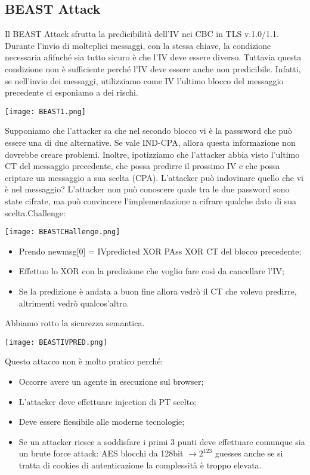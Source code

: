 \documentclass{article}
\theoremstyle{remark}
\begin{document}
\subsection{BEAST Attack}
Il BEAST Attack sfrutta la predicibilità dell'IV nei CBC in TLS v.1.0/1.1. Durante l'invio di molteplici messaggi, con la stessa chiave, la condizione necessaria afifnché sia tutto sicuro è che l'IV deve essere diverso. Tuttavia questa condizione non è sufficiente perché l'IV deve essere anche non predicibile.
Infatti, se nell'invio dei messaggi, utilizziamo come IV l'ultimo blocco del messaggio precedente ci esponiamo a dei rischi.
\begin{center}
    \texttt{[image: BEAST1.png]}
\end{center}
Supponiamo che l'attacker sa che nel secondo blocco vi è la passsword che può essere una di due alternative. Se vale IND-CPA, allora questa informazione non dovrebbe creare problemi. Inoltre, ipotizziamo che l'attacker abbia visto l'ultimo CT del messaggio precedente, che possa predirre il prossimo IV e che possa criptare un messaggio a sua scelta (CPA). L'attacker può indovinare quello che vi è nel messaggio?\newline
L'attacker non può conoscere quale tra le due password sono state cifrate, ma può convincere l'implementazione a cifrare qualche dato di sua scelta.Challenge:\begin{center}
    \texttt{[image: BEASTCHallenge.png]}
\end{center}
\begin{itemize}
    \item Prendo newmsg[0] = IVpredicted XOR PAss XOR CT del blocco precedente;
    \item Effettuo lo XOR con la predizione che voglio fare così da cancellare l'IV;
    \item Se la predizione è andata a buon fine allora vedrò il CT che volevo predirre, altrimenti vedrò qualcos'altro.
\end{itemize}
Abbiamo rotto la sicurezza semantica.\begin{center}
    \texttt{[image: BEASTIVPRED.png]}
\end{center}
Questo attacco non è molto pratico perché:\begin{itemize}
    \item Occorre avere un agente in esecuzione sul browser;
    \item L'attacker deve effettuare injection di PT scelto;
    \item Deve essere flessibile alle moderne tecnologie;
    \item Se un attacker riesce a soddisfare i primi  3 punti deve effettuare comunque sia un brute force attack: AES blocchi da 128bit $\rightarrow 2^{123}$ guesses anche se si tratta di cookies di autenticazione la complessità è troppo elevata.
\end{itemize}
\end{document}
